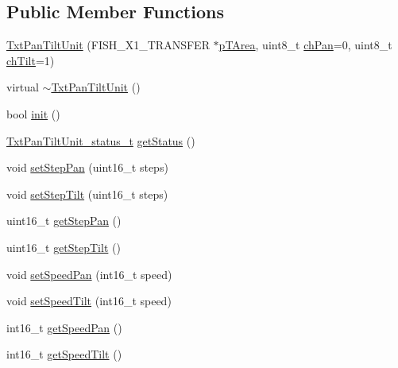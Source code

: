 \subsection*{Public Member Functions}
\begin{DoxyCompactItemize}
\item 
\hyperlink{classft_1_1_txt_pan_tilt_unit_a751edaac373d0e0e860dc2f8c2c4c282}{Txt\+Pan\+Tilt\+Unit} (F\+I\+S\+H\+\_\+\+X1\+\_\+\+T\+R\+A\+N\+S\+F\+ER $\ast$\hyperlink{classft_1_1_txt_pan_tilt_unit_a0980755f4b1e238ff65ce3799133a1cd}{p\+T\+Area}, uint8\+\_\+t \hyperlink{classft_1_1_txt_pan_tilt_unit_a1a565a8918d7e9ca3dd33280a20c32dc}{ch\+Pan}=0, uint8\+\_\+t \hyperlink{classft_1_1_txt_pan_tilt_unit_acddd9fc227b70c060fb5816870677101}{ch\+Tilt}=1)
\item 
virtual \hyperlink{classft_1_1_txt_pan_tilt_unit_a94f6d6ffcf28ca4dd2dc52a507656409}{$\sim$\+Txt\+Pan\+Tilt\+Unit} ()
\item 
bool \hyperlink{classft_1_1_txt_pan_tilt_unit_abc56d932cec09c497a6a803d21f296de}{init} ()
\item 
\hyperlink{namespaceft_aaf50a06f05b9188eeec535212b261df0}{Txt\+Pan\+Tilt\+Unit\+\_\+status\+\_\+t} \hyperlink{classft_1_1_txt_pan_tilt_unit_a2dd82f8f2af4844498773aa039e33ca1}{get\+Status} ()
\item 
void \hyperlink{classft_1_1_txt_pan_tilt_unit_a5afa571e04da333164a4b372c242064b}{set\+Step\+Pan} (uint16\+\_\+t steps)
\item 
void \hyperlink{classft_1_1_txt_pan_tilt_unit_a317eb98f588ecff30289880bd0175d13}{set\+Step\+Tilt} (uint16\+\_\+t steps)
\item 
uint16\+\_\+t \hyperlink{classft_1_1_txt_pan_tilt_unit_a63fbb66a26974f73726168782db3bb07}{get\+Step\+Pan} ()
\item 
uint16\+\_\+t \hyperlink{classft_1_1_txt_pan_tilt_unit_acecf4cc15094fbf0bbe5f9d69b972846}{get\+Step\+Tilt} ()
\item 
void \hyperlink{classft_1_1_txt_pan_tilt_unit_af8e93c217fc34a2f5b56b22fd9442553}{set\+Speed\+Pan} (int16\+\_\+t speed)
\item 
void \hyperlink{classft_1_1_txt_pan_tilt_unit_a44d7dc0b533907ff1e475cffde4c3f5c}{set\+Speed\+Tilt} (int16\+\_\+t speed)
\item 
int16\+\_\+t \hyperlink{classft_1_1_txt_pan_tilt_unit_ad7dcae4da1224cab6c2bb50698abb83e}{get\+Speed\+Pan} ()
\item 
int16\+\_\+t \hyperlink{classft_1_1_txt_pan_tilt_unit_a445c47c5d67d0226c91d08567c2e14c0}{get\+Speed\+Tilt} ()
\item 

\end{DoxyCompactItemize}
